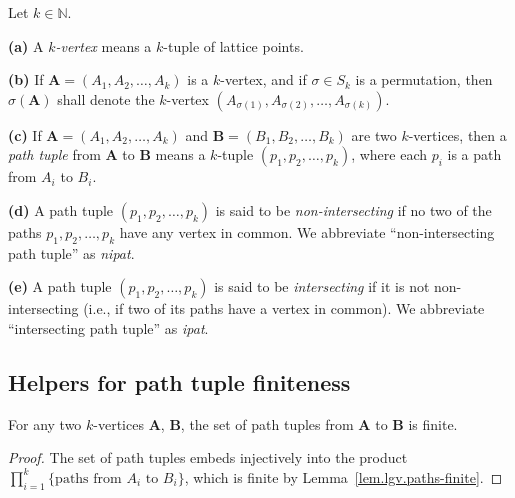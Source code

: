 \begin{definition}
\label{def.lgv.path-tups}
\leantarget
\leanok
Let $k\in\mathbb{N}$.

\textbf{(a)} A $k$\emph{-vertex} means a $k$-tuple of lattice points.

\textbf{(b)} If $\mathbf{A}=\left(  A_{1},A_{2},\ldots,A_{k}\right)  $ is a
$k$-vertex, and if $\sigma\in S_{k}$ is a permutation, then $\sigma\left(
\mathbf{A}\right)  $ shall denote the $k$-vertex $\left(  A_{\sigma\left(
1\right)  },A_{\sigma\left(  2\right)  },\ldots,A_{\sigma\left(  k\right)
}\right)  $.

\textbf{(c)} If $\mathbf{A}=\left(  A_{1},A_{2},\ldots,A_{k}\right)  $ and
$\mathbf{B}=\left(  B_{1},B_{2},\ldots,B_{k}\right)  $ are two $k$-vertices,
then a \emph{path tuple} from $\mathbf{A}$ to $\mathbf{B}$ means a $k$-tuple
$\left(  p_{1},p_{2},\ldots,p_{k}\right)  $, where each $p_{i}$ is a path from
$A_{i}$ to $B_{i}$.

\textbf{(d)} A path tuple $\left(  p_{1},p_{2},\ldots,p_{k}\right)  $ is said
to be \emph{non-intersecting} if no two of the paths $p_{1},p_{2},\ldots
,p_{k}$ have any vertex in common.
We abbreviate ``non-intersecting path tuple'' as \emph{nipat}.

\textbf{(e)} A path tuple $\left(  p_{1},p_{2},\ldots,p_{k}\right)  $ is said
to be \emph{intersecting} if it is not non-intersecting (i.e., if two of its
paths have a vertex in common).
We abbreviate ``intersecting path tuple'' as \emph{ipat}.
\end{definition}

\subsection{Helpers for path tuple finiteness}

\begin{lemma}
\label{lem.lgv.pathtup-finite}
\leanhelper
\leanok
For any two $k$-vertices $\mathbf{A}$, $\mathbf{B}$, the set of path
tuples from $\mathbf{A}$ to $\mathbf{B}$ is finite.
\end{lemma}

\begin{proof}
\leanok
The set of path tuples embeds injectively into the product
$\prod_{i=1}^k \{\text{paths from } A_i \text{ to } B_i\}$, which is finite
by Lemma~\ref{lem.lgv.paths-finite}.
\end{proof}


